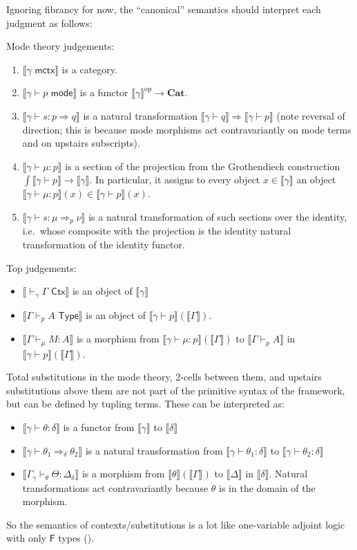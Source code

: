 \documentclass[10pt]{article}
\theoremstyle{definition}
\newcommand{\yields}{\vdash}
\newcommand{\tcell}{\Rightarrow}
\newcommand{\CTX}{\,\,\mathsf{Ctx}}
\newcommand{\ctx}{\,\,\mathsf{mctx}}
\newcommand{\TYPE}{\,\,\mathsf{Type}}
\newcommand{\type}{\,\,\mathsf{mode}}
\newcommand\Fsym{\ensuremath{\mathsf{F}}}
\newcommand\TypeTwo[4]{\ensuremath{#1 \vdash #2 :  #3 \tcell #4}}
\newcommand\TermTwoT[5]{\ensuremath{#1 \vdash {#2} : #3 \tcell_{#5} #4}}
\newcommand\mm[1]{\llbracket #1 \rrbracket}
\newcommand\op{^{\mathrm{op}}}
\newcommand\Cat{\mathbf{Cat}}
\begin{document}
Ignoring fibrancy for now, the ``canonical'' semantics should interpret each judgment as follows:

Mode theory judgements:
\begin{enumerate}
\item $\mm{\gamma \ctx}$ is a category.
\item $\mm{\gamma \yields p \type}$ is a functor $\mm{\gamma}\op \to \Cat$.
\item $\mm{\TypeTwo{\gamma}{s}{p}{q}}$ is a natural transformation $\mm{\gamma \yields q} \Rightarrow \mm{\gamma \yields p}$ (note reversal of direction; this is because mode morphisms act contravariantly on mode terms and on upstairs subscripts).
\item $\mm{\gamma \yields \mu : p}$ is a section of the projection from the Grothendieck construction $\int\mm{\gamma\yields p} \to \mm{\gamma}$.
  In particular, it assigns to every object $x\in \mm{\gamma}$ an object $\mm{\gamma \yields \mu : p}(x)\in \mm{\gamma\yields p}(x)$.
\item $\mm{\TermTwoT{\gamma}{s}{\mu}{\nu}{p}}$ is a natural transformation of such sections over the identity, i.e.\ whose composite with the projection is the identity natural transformation of the identity functor.
\end{enumerate}

Top judgements: 
\begin{itemize}
\item $\mm{\yields_\gamma \Gamma \CTX}$ is an object of $\mm{\gamma}$
\item $\mm{\Gamma \yields_p A \TYPE}$ is an object of $\mm{\gamma \yields p}(\mm{\Gamma})$.
\item $\mm{\Gamma \yields_\mu M : A}$ is a morphism from $\mm{\gamma \yields \mu : p}(\mm{\Gamma})$ to $\mm{\Gamma \yields_p A}$ in $\mm{\gamma \yields p}(\mm{\Gamma})$.
\end{itemize}

Total substitutions in the mode theory, 2-cells between them, and
upstairs substitutions above them are not part of the primitive syntax
of the framework, but can be defined by tupling terms.
These can be interpreted as: 
\begin{itemize}
\item $\mm{\gamma \yields \theta : \delta}$ is a functor from $\mm{\gamma}$ to $\mm{\delta}$
\item $\mm{\gamma \yields \theta_1 \tcell_\delta \theta_2}$ is a natural
  transformation from $\mm{\gamma \yields \theta_1 : \delta}$ to
  $\mm{\gamma \yields \theta_2 : \delta}$
\item $\mm{\Gamma_{\gamma} \yields_\theta \Theta : \Delta_\delta}$ is a
  morphism from $\mm{\theta}(\mm{\Gamma})$ to $\mm{\Delta}$ in
  $\mm{\delta}$.
  Natural transformations act contravariantly because $\theta$ is in the
  domain of the morphism.  
  \end{itemize}
So the semantics of contexts/substitutions is a lot like 
one-variable adjoint logic with only $\Fsym$ types (\cite{ls16adjoint-extended}).
\end{document}
